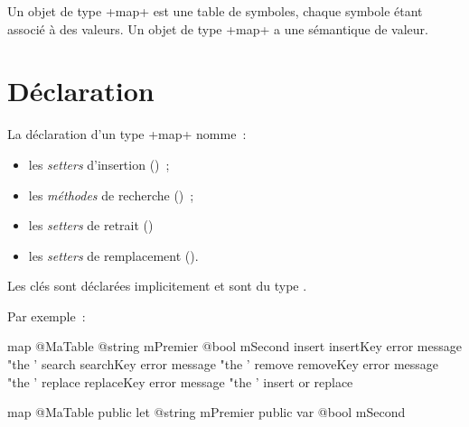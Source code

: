 



Un objet de type \ggst+map+ est une table de symboles, chaque symbole étant associé à des valeurs. Un objet de type \ggst+map+ a une sémantique de valeur.

\section{Déclaration}

La déclaration d'un type \ggst+map+ nomme~:
\begin{itemize}
  \item les \emph{setters} d'insertion ()~;
  \item les \emph{méthodes} de recherche ()~;
  \item les \emph{setters} de retrait ()~
  \item les \emph{setters} de remplacement ().
\end{itemize}

Les clés sont déclarées implicitement et sont du type .

Par exemple~:

\begin{galgas3}
map @MaTable {
  @string mPremier
  @bool mSecond
  insert insertKey error message "the '%
  search searchKey error message "the '%
  remove removeKey error message "the '%
  replace replaceKey error message "the '%
  insert or replace
}
\end{galgas3}


\begin{galgas4}
map @MaTable {
  public let @string mPremier
  public var @bool mSecond
}
\end{galgas4}

